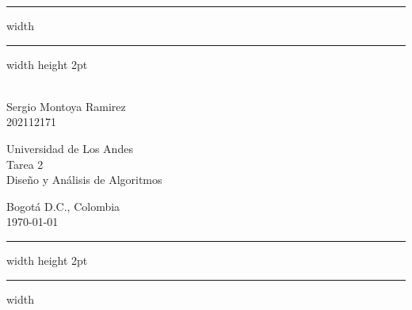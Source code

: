 \newenvironment{notes}
  {\begin{list}
     {{\fbseries Note \arabic{counter}.}}
    {\usecounter{counter}
     \setlength{\labelsep}{1em}
     \setlength{\itemsep}{2pt}
     \setlength{\leftmargin}{2em}
     \setlength{\rightmargin}{0cm}
     \setlength{\itemindent}{1em} }}
{\end{list}}

\vspace*{-1cm}
\hrule width \hsize \kern 1mm \hrule width \hsize height 2pt
\begin{center}
   \parbox[c]{.32\textwidth}{
   \hspace{1cm}\\
   Sergio Montoya Ramirez\\
   202112171}
   \hspace*{\fill}
   \parbox[c]{.35\textwidth}{\centering
   Universidad de Los Andes\\
   Tarea 2\\
   Diseño y Análisis de Algoritmos\\
   }
   \hspace*{\fill}
   \parbox[c]{.3\textwidth}{
   \begin{flushleft}
      Bogotá D.C., Colombia\\
      \today
   \end{flushleft}}
\end{center}
\hrule width \hsize height 2pt \kern 1mm \hrule width \hsize

\bigskip

